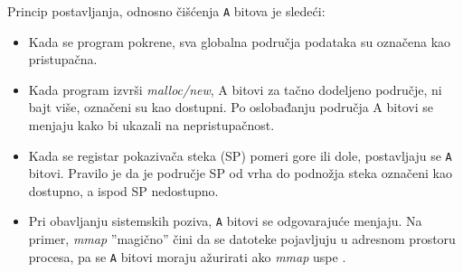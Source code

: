 \documentclass[12pt,oneside]{memoir}
\theoremstyle{plain}
\theoremstyle{definition}
\begin{document}
Princip postavljanja, odnosno čišćenja \texttt{A} bitova je sledeći:
\begin{itemize}
\item Kada se program pokrene, sva globalna područja podataka su označena kao pristupačna.
\item Kada program izvrši \textit{malloc/new}, A bitovi za tačno dodeljeno područje, ni bajt više, označeni su kao dostupni. Po oslobađanju područja A bitovi se menjaju kako bi ukazali na nepristupačnost.
\item Kada se registar pokazivača steka (SP) pomeri gore ili dole, postavljaju se \texttt{A} bitovi. Pravilo je da je područje SP od vrha do podnožja steka označeni kao dostupno, a ispod SP nedostupno. 
\item Pri obavljanju sistemskih poziva, \texttt{A} bitovi se odgovarajuće menjaju. Na primer, \textit{mmap} ''magično'' čini da se datoteke pojavljuju u adresnom prostoru procesa, pa se \texttt{A} bitovi moraju ažurirati ako \textit{mmap} uspe \cite{Memcheck}. 
\end{itemize}
\end{document}
